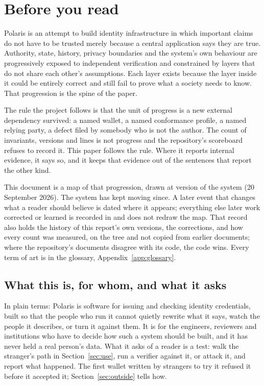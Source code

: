 \section*{Before you read}

Polaris is an attempt to build identity infrastructure in which important claims do not have to
be trusted merely because a central application says they are true. Authority, state, history,
privacy boundaries and the system's own behaviour are progressively exposed to independent
verification and constrained by layers that do not share each other's assumptions. Each layer exists
because the layer inside it could be entirely correct and still fail to prove what a society needs
to know. That progression is the spine of the paper.

The rule the project follows is that the unit of progress
is a new external dependency survived: a named wallet, a named conformance profile, a named relying
party, a defect filed by somebody who is not the author. The count of invariants, versions and lines
is not progress and the repository's scoreboard refuses to record it. This paper follows the rule.
Where it reports internal evidence, it says so, and it keeps that evidence out of the sentences that
report the other kind.

This document is a map of that progression, drawn at version  of the system
(20 September 2026). The system has kept moving since. A later event that changes what a reader
should believe is dated where it appears; everything else later work corrected or learned is
recorded in \evidencerecord{} and does not redraw the map. That record also holds the history of
this report's own versions, the corrections, and how every count was measured, on the tree and not
copied from earlier documents; where the repository's documents disagree with its code, the code
wins. Every term of art is in the glossary, Appendix~\ref{app:glossary}.

\subsection*{What this is, for whom, and what it asks}

In plain terms: Polaris is software for issuing and checking identity credentials, built so that
the people who run it cannot quietly rewrite what it says, watch the people it describes, or turn
it against them. It is for the engineers, reviewers and institutions who have to decide how such a
system should be built, and it has never held a real person's data. What it asks of a reader is a
test: walk the stranger's path in Section~\ref{sec:use}, run a verifier against it, or attack it,
and report what happened. The first wallet written by strangers to try it refused it before it accepted
it; Section~\ref{sec:outside} tells how.

